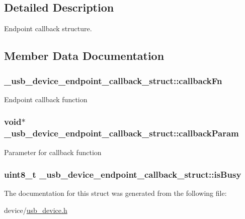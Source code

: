 \subsection{Detailed Description}
Endpoint callback structure. 

\subsection{Member Data Documentation}
\hypertarget{struct__usb__device__endpoint__callback__struct_a9114dcbee3570dec5183be652ae42f8c}{
\subsubsection[{callback\-Fn}]{ \-\_\-usb\-\_\-device\-\_\-endpoint\-\_\-callback\-\_\-struct\-::callback\-Fn}}\label{struct__usb__device__endpoint__callback__struct_a9114dcbee3570dec5183be652ae42f8c}
Endpoint callback function \hypertarget{struct__usb__device__endpoint__callback__struct_a40161b7e8305ba255c00567492ad9b3e}{
\subsubsection[{callback\-Param}]{\setlength{\rightskip}{0pt plus 5cm}void$\ast$ \-\_\-usb\-\_\-device\-\_\-endpoint\-\_\-callback\-\_\-struct\-::callback\-Param}}\label{struct__usb__device__endpoint__callback__struct_a40161b7e8305ba255c00567492ad9b3e}
Parameter for callback function \hypertarget{struct__usb__device__endpoint__callback__struct_afa1b230c2518235fd2b5838ddee9b79d}{
\subsubsection[{is\-Busy}]{\setlength{\rightskip}{0pt plus 5cm}uint8\-\_\-t \-\_\-usb\-\_\-device\-\_\-endpoint\-\_\-callback\-\_\-struct\-::is\-Busy}}\label{struct__usb__device__endpoint__callback__struct_afa1b230c2518235fd2b5838ddee9b79d}


The documentation for this struct was generated from the following file\-:\begin{DoxyCompactItemize}
\item 
device/\hyperlink{usb__device_8h}{usb\-\_\-device.\-h}\end{DoxyCompactItemize}
